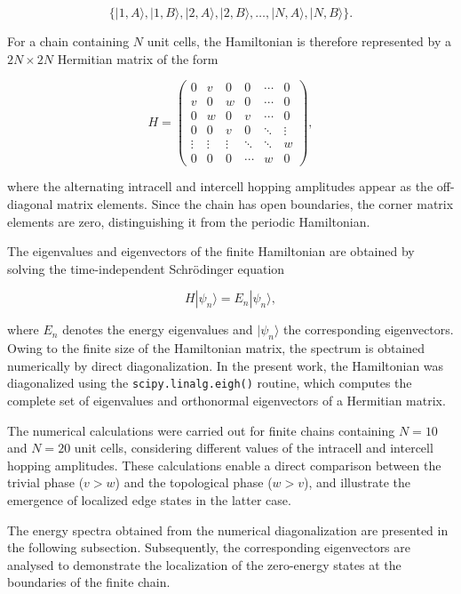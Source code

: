 \documentclass[11pt, a4paper]{article}
\begin{document}
\[
\{
|1,A\rangle,
|1,B\rangle,
|2,A\rangle,
|2,B\rangle,
\ldots,
|N,A\rangle,
|N,B\rangle
\}.
\]

For a chain containing \(N\) unit cells, the Hamiltonian is therefore represented by a \(2N\times2N\) Hermitian matrix of the form

\begin{equation}
H=
\begin{pmatrix}
0&v&0&0&\cdots&0\\
v&0&w&0&\cdots&0\\
0&w&0&v&\cdots&0\\
0&0&v&0&\ddots&\vdots\\
\vdots&\vdots&\vdots&\ddots&\ddots&w\\
0&0&0&\cdots&w&0
\end{pmatrix},
\label{eq:finite_matrix}
\end{equation}

where the alternating intracell and intercell hopping amplitudes appear as the off-diagonal matrix elements. Since the chain has open boundaries, the corner matrix elements are zero, distinguishing it from the periodic Hamiltonian.

The eigenvalues and eigenvectors of the finite Hamiltonian are obtained by solving the time-independent Schrödinger equation

\begin{equation}
H|\psi_n\rangle
=
E_n|\psi_n\rangle,
\end{equation}

where \(E_n\) denotes the energy eigenvalues and \(|\psi_n\rangle\) the corresponding eigenvectors. Owing to the finite size of the Hamiltonian matrix, the spectrum is obtained numerically by direct diagonalization. In the present work, the Hamiltonian was diagonalized using the \texttt{scipy.linalg.eigh()} routine, which computes the complete set of eigenvalues and orthonormal eigenvectors of a Hermitian matrix.

The numerical calculations were carried out for finite chains containing \(N=10\) and \(N=20\) unit cells, considering different values of the intracell and intercell hopping amplitudes. These calculations enable a direct comparison between the trivial phase (\(v>w\)) and the topological phase (\(w>v\)), and illustrate the emergence of localized edge states in the latter case.

The energy spectra obtained from the numerical diagonalization are presented in the following subsection. Subsequently, the corresponding eigenvectors are analysed to demonstrate the localization of the zero-energy states at the boundaries of the finite chain.
\end{document}
